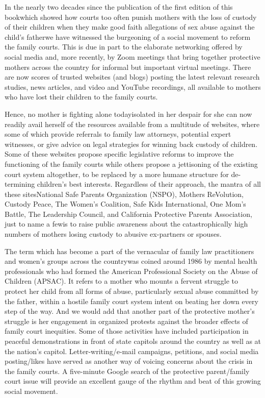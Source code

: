 \noindent{}In the nearly two decades since the publication of the first edition of this
book\mdash{}which showed how courts too often punish mothers with the
loss of custody of their children when they make good faith allegations
of sex abuse against the child's father\mdash{}we have witnessed the burgeoning
of a social movement to reform the family courts.  This is due in part to the elaborate networking offered by social media and, more recently, by Zoom
meetings that bring together protective mothers across the country for
informal but important virtual meetings. There are now scores of trusted websites (and blogs) posting the latest relevant research studies, news articles, and
video and YouTube recordings, all available to mothers who have lost
their children to the family courts. \pfl{}

Hence, no mother is fighting alone today\mdash{}isolated in her despair\mdash{}
for she can now readily avail herself of the resources available from a
multitude of websites, where some of which provide referrals to family 
law attorneys, potential expert witnesses, or give advice on legal
strategies for winning back custody of children. Some of these websites
propose specific legislative reforms to improve the functioning of the
family courts while others propose a jettisoning of the existing court
system altogether, to be replaced by a more humane structure for de-
termining children's best interests. Regardless of their approach, the
mantra of all these sites\mdash{}National Safe 
Parents Organization (NSPO), Mothers ReVolution, Custody Peace, The Women's Coalition, 
Safe Kids International, One Mom's Battle, 
The Leadership Council, and California 
Protective Parents Association, just to name a few\mdash{}is to raise
public awareness about the catastrophically high numbers of mothers
losing custody to abusive ex-partners or spouses. \pfl{}


The term \mdash{}which has become a part of the vernacular of family law practitioners and women's groups across the
country\mdash{}was coined around 1986 by mental health professionals who
had formed the American Professional Society on the Abuse of Children
(APSAC). It refers to a mother who mounts a fervent struggle to protect
her child from all forms of abuse, particularly sexual abuse committed by 
the father, within a hostile family court system intent on beating her
down every step of the way. And we would add that another
part of the protective mother's struggle is her engagement in organized
protests against the broader effects of family court inequities. Some of
those activities have included participation in peaceful demonstrations
in front of state capitols around the country as well as at the nation's
capitol. Letter-writing/e-mail campaigns, petitions, and social media
posting/likes have served as another way of voicing concerns about the
crisis in the family courts. A five-minute Google search of the protective
parent/family court issue will provide an excellent gauge of the rhythm
and beat of this growing social movement. \pfl{}\newpage{}


